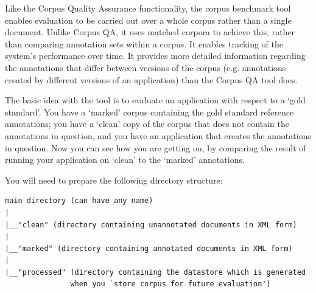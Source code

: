 Like the Corpus Quality Assurance functionality, the corpus benchmark tool
 enables evaluation to be carried out over a whole corpus rather than a
single document. Unlike Corpus QA, it uses matched corpora to achieve this,
rather than comparing annotation sets within a corpus. It enables tracking of the
system's performance over time. It provides more detailed information regarding
the annotations that differ between versions of the corpus (e.g. annotations
created by different versions of an application) than the Corpus QA tool does.

The basic idea with the tool is to evaluate an application with respect to a
`gold standard'. You have a `marked' corpus containing the gold standard
reference annotations; you have a `clean' copy of the corpus that does not
contain the annotations in question, and you have an application that creates the
annotations in question. Now you can see how you are getting on, by comparing the
result of running your application on `clean' to the `marked' annotations.


You will need to prepare the following directory structure:

\begin{small}\begin{verbatim}
main directory (can have any name)
|
|__"clean" (directory containing unannotated documents in XML form)
|
|__"marked" (directory containing annotated documents in XML form)
|
|__"processed" (directory containing the datastore which is generated
               when you `store corpus for future evaluation')
\end{verbatim}\end{small}

